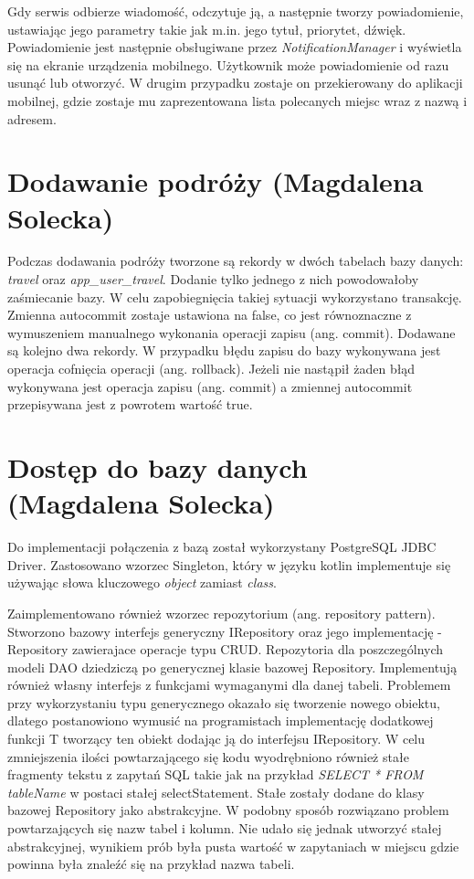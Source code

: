 \documentclass[10pt,twoside,a4paper]{report}
\begin{document}
\par Gdy serwis odbierze wiadomość, odczytuje ją, a następnie tworzy powiadomienie, ustawiając jego parametry takie jak m.in. jego tytuł, priorytet, dźwięk. Powiadomienie jest następnie obsługiwane przez \textit{NotificationManager} i wyświetla się na ekranie urządzenia mobilnego. Użytkownik może powiadomienie od razu usunąć lub otworzyć. W drugim przypadku zostaje on przekierowany do aplikacji mobilnej, gdzie zostaje mu zaprezentowana lista polecanych miejsc wraz z nazwą i adresem.

\section{Dodawanie podróży (Magdalena Solecka)}
\par Podczas dodawania podróży tworzone są rekordy w dwóch tabelach bazy danych: \textit{travel} oraz \textit{app\_user\_travel}. Dodanie tylko jednego z nich powodowałoby zaśmiecanie bazy. W celu zapobiegnięcia takiej sytuacji wykorzystano transakcję. Zmienna autocommit zostaje ustawiona na false, co jest równoznaczne z wymuszeniem manualnego wykonania operacji zapisu (ang. commit). Dodawane są kolejno dwa rekordy. W przypadku błędu zapisu do bazy wykonywana jest operacja cofnięcia operacji (ang. rollback). Jeżeli nie nastąpił żaden błąd wykonywana jest operacja zapisu (ang. commit) a zmiennej autocommit przepisywana jest z powrotem wartość true.

\section{Dostęp do bazy danych (Magdalena Solecka)}
\par Do implementacji połączenia z bazą został wykorzystany PostgreSQL JDBC Driver. Zastosowano wzorzec Singleton, który w języku kotlin implementuje się używając słowa kluczowego \textit{object} zamiast \textit{class}.
\par Zaimplementowano również wzorzec repozytorium (ang. repository pattern). Stworzono bazowy interfejs generyczny IRepository oraz jego implementację - Repository zawierajace operacje typu CRUD. Repozytoria dla poszczególnych modeli DAO dziedziczą po generycznej klasie bazowej Repository. Implementują również własny interfejs z funkcjami wymaganymi dla danej tabeli. Problemem przy wykorzystaniu typu generycznego okazało się tworzenie nowego obiektu, dlatego postanowiono wymusić na programistach implementację dodatkowej funkcji T tworzący ten obiekt dodając ją do interfejsu IRepository. W celu zmniejszenia ilości powtarzającego się kodu wyodrębniono również stałe fragmenty tekstu z zapytań SQL takie jak na przykład \textit{SELECT * FROM tableName } w postaci stałej selectStatement. Stałe zostały dodane do klasy bazowej Repository jako abstrakcyjne. W podobny sposób rozwiązano problem powtarzających się nazw tabel i kolumn. Nie udało się jednak utworzyć stałej abstrakcyjnej, wynikiem prób była pusta wartość w zapytaniach w miejscu gdzie powinna była znaleźć się na przykład nazwa tabeli.
	
\end{document}
